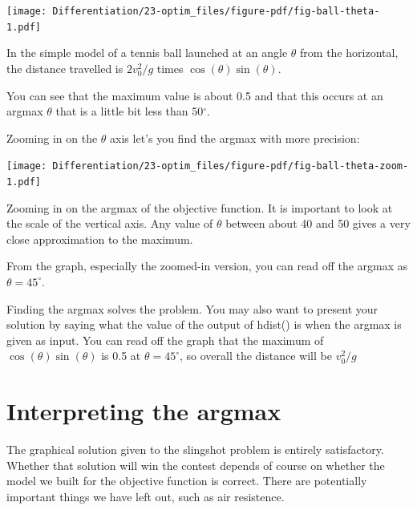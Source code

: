 \documentclass[
  letterpaper,
  DIV=11,
  numbers=noendperiod,
  oneside]{scrreprt}
\begin{document}
\begin{marginfigure}

{\centering \texttt{[image: Differentiation/23-optim\_files/figure-pdf/fig-ball-theta-1.pdf]}

}

\caption{\label{fig-ball-theta}In the simple model of a tennis ball
launched at an angle \(\theta\) from the horizontal, the distance
travelled is \(2 v_0^2 / g\) times \(\cos(\theta)\sin(\theta)\).}

\end{marginfigure}

You can see that the maximum value is about 0.5 and that this occurs at
an argmax \(\theta\) that is a little bit less than 50\(^\circ\).

Zooming in on the \(\theta\) axis let's you find the argmax with more
precision:

\begin{marginfigure}

{\centering \texttt{[image: Differentiation/23-optim\_files/figure-pdf/fig-ball-theta-zoom-1.pdf]}

}

\caption{\label{fig-ball-theta-zoom}Zooming in on the argmax of the
objective function. It is important to look at the scale of the vertical
axis. Any value of \(\theta\) between about 40 and 50 gives a very close
approximation to the maximum.}

\end{marginfigure}

From the graph, especially the zoomed-in version, you can read off the
argmax as \(\theta = 45^\circ\).

Finding the argmax solves the problem. You may also want to present your
solution by saying what the value of the output of hdist() is when the
argmax is given as input. You can read off the graph that the maximum of
\(\cos(\theta)\sin(\theta)\) is 0.5 at \(\theta = 45^\circ\), so overall
the distance will be \(v_0^2 / g\)

\hypertarget{interpreting-the-argmax}{%
\section{Interpreting the argmax}\label{interpreting-the-argmax}}

The graphical solution given to the slingshot problem is entirely
satisfactory. Whether that solution will win the contest depends of
course on whether the model we built for the objective function is
correct. There are potentially important things we have left out, such
as air resistence.
\end{document}
